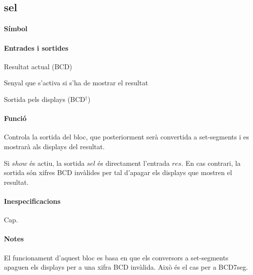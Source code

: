\subsection{\label{sub:\projectname-sel} \textsf{sel}}

\paragraph{Símbol}

\begin{center}  \end{center}

\paragraph{Entrades i sortides}

\begin{where}
\item[\nodenamerange{res}{7}{0}] Resultat actual (BCD)
\item[\nodenamebit{show}] Senyal que s'activa si s'ha de mostrar el resultat
\item[\nodenamerange{sel}{7}{0}] Sortida pels displays (BCD$^\dagger$)
\end{where}

\paragraph{Funció}

Controla la sortida del bloc, que posteriorment serà convertida a set-segments
i es mostrarà als displays del resultat.

Si $show$ és actiu, la sortida $sel$ és directament l'entrada $res$. En cas contrari,
la sortida són xifres BCD invàlides per tal d'apagar els displays que mostren
el resultat.

\paragraph{Inespecificacions}

Cap.

\paragraph{Notes}

El funcionament d'aquest bloc es basa en que els conversors a set-segments
apaguen els displays per a una xifra BCD invàlida. Això és el cas per a
\textsf{BCD7seg}.


